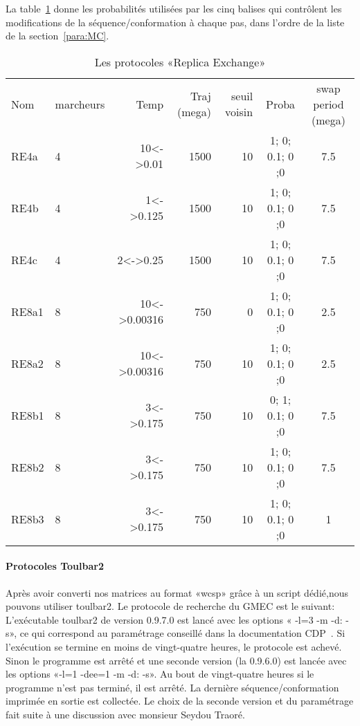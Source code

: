 La table~\ref{tab:protoRE} donne les probabilités utilisées par les cinq balises qui contrôlent les modifications de la séquence/conformation à chaque pas, dans l'ordre de la liste de la section~\ref{para:MC}. 
    
    \begin{table}[!htbp]
      \centering

      \begin{tabular}{llrrrcc}

        \toprule
        Nom & marcheurs &Temp & Traj (mega)& seuil voisin  & Proba & swap period (mega)\\
        \cmidrule{1-7}
        RE4a   & 4 & 10<->0.01    &  1500 & 10 & 1; 0; 0.1; 0 ;0 &  7.5\\  
        RE4b   & 4 & 1<->0.125    &  1500 & 10 & 1; 0; 0.1; 0 ;0 &  7.5\\  
        RE4c   & 4 & 2<->0.25     &  1500 & 10 & 1; 0; 0.1; 0 ;0 &  7.5\\  
        RE8a1  & 8 & 10<->0.00316 &  750  & 0  & 1; 0; 0.1; 0 ;0 &  2.5\\  
        RE8a2  & 8 & 10<->0.00316 &  750  & 10 & 1; 0; 0.1; 0 ;0 &  2.5\\  
        RE8b1  & 8 & 3<->0.175    &  750  & 10 & 0; 1; 0.1; 0 ;0 &  7.5\\
        RE8b2  & 8 & 3<->0.175    &  750  & 10 & 1; 0; 0.1; 0 ;0 &  7.5\\
        RE8b3  & 8 & 3<->0.175    &  750  & 10 & 1; 0; 0.1; 0 ;0 &  1\\
        \bottomrule

      \end{tabular}      
      \caption{Les protocoles «Replica Exchange»}
\label{tab:protoRE}      
    \end{table}

   \paragraph{Protocoles Toulbar2} 
\label{proto_toulbar2}

Après avoir converti nos matrices au format «wcsp» grâce à un script dédié,nous pouvons utiliser toulbar2.
Le protocole de recherche du GMEC est le suivant:
L'exécutable toulbar2 de version 0.9.7.0 est lancé avec les options « -l=3 -m -d: -s», ce qui correspond au paramétrage conseillé dans la documentation CDP~\citep{reftoulbar1,reftoulbar2}. Si l'exécution se termine en moins de vingt-quatre heures, le protocole est achevé. Sinon le programme est arrêté et une seconde version (la 0.9.6.0) est lancée avec les options «-l=1 -dee=1 -m -d: -s». Au bout de vingt-quatre heures si le programme n'est pas terminé, il est arrêté. La dernière séquence/conformation imprimée en sortie est collectée. Le choix de la seconde version et du paramétrage fait suite à une discussion avec monsieur Seydou Traoré.  

